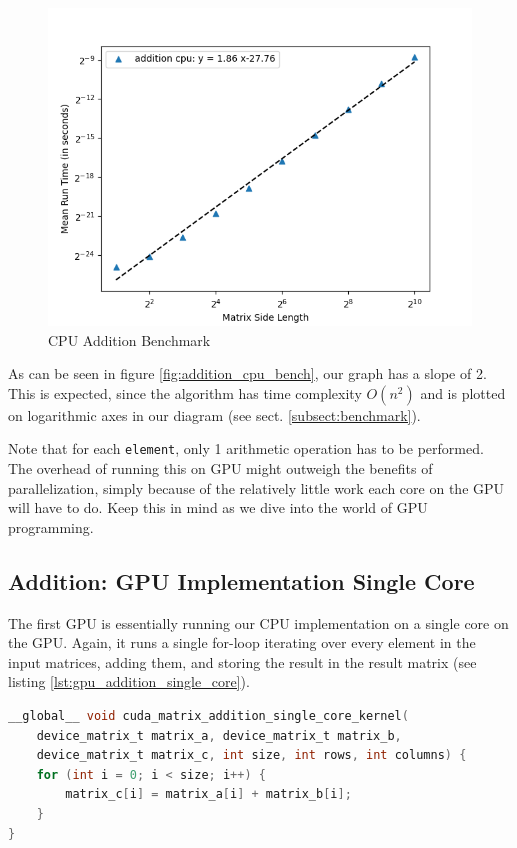 \begin{figure}[ht]
    \centering
    \includegraphics[width=\textwidth]{SavedBenchmarksAndDiagrams/Machine 2/Addition/CPU.png}
    \caption{CPU Addition Benchmark}
    \label{fig:enter-label}
\end{figure}

 As can be seen in figure \ref{fig:addition_cpu_bench}, our graph has a slope of 2. This is expected, since the algorithm has time complexity $O(n^2)$ and is plotted on logarithmic axes in our diagram (see sect. \ref{subsect:benchmark}).

Note that for each \texttt{element}, only 1 arithmetic operation has to be performed. The overhead of running this on GPU might outweigh the benefits of parallelization, simply because of the relatively little work each core on the GPU will have to do. Keep this in mind as we dive into the world of GPU programming.

\subsection{Addition: GPU Implementation Single Core}
The first GPU is essentially running our CPU implementation on a single core on the GPU. Again, it runs a single for-loop iterating over every element in the input matrices, adding them, and storing the result in the result matrix (see listing \ref{lst:gpu_addition_single_core}).

\begin{lstlisting}[language=C, caption={GPU addition single core}, label={lst:gpu_addition_single_core}]
__global__ void cuda_matrix_addition_single_core_kernel(
    device_matrix_t matrix_a, device_matrix_t matrix_b,
    device_matrix_t matrix_c, int size, int rows, int columns) {
    for (int i = 0; i < size; i++) {
        matrix_c[i] = matrix_a[i] + matrix_b[i];
    }
}
\end{lstlisting}


